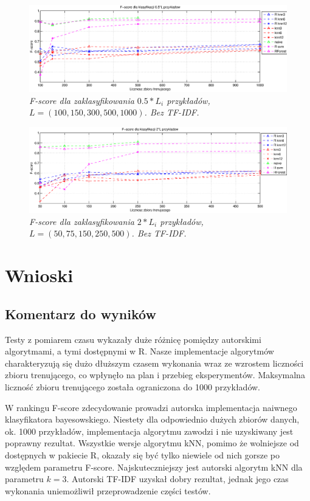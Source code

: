 \documentclass[a4paper, 10pt]{article}
\begin{document}
\begin{figure}[ht!]
\centering
\includegraphics[width=165mm]{wykresy/score1000-05.eps}
\caption{\it{F-score dla zaklasyfikowania $0.5*L_i$ przykładów, $L=(100,150,300,500,1000)$. Bez TF-IDF.}}
\label{overflow}
\end{figure}

\begin{figure}[ht!]
\centering
\includegraphics[width=165mm]{wykresy/score500-2.eps}
\caption{\it{F-score dla zaklasyfikowania $2*L_i$ przykładów, $L=(50,75,150,250,500)$. Bez TF-IDF.}}
\label{overflow}
\end{figure}

\FloatBarrier

\newpage
\section{Wnioski}

\subsection{Komentarz do wyników}

Testy z pomiarem czasu wykazały duże różnicę pomiędzy autorskimi algorytmami, a tymi dostępnymi w R. Nasze implementacje algorytmów charakteryzują się dużo dłuższym
czasem wykonania wraz ze wzrostem liczności zbioru trenującego, co wpłynęło na plan i przebieg eksperymentów. Maksymalna liczność zbioru trenującego została ograniczona do 1000 przykładów.

W rankingu F-score zdecydowanie prowadzi autorska implementacja naiwnego klasyfikatora bayesowskiego. Niestety dla odpowiednio dużych zbiorów danych, ok. 1000 przykładów, implementacja algorytmu
zawodzi i nie uzyskiwany jest poprawny rezultat. Wszystkie wersje algorytmu kNN, pomimo że wolniejsze od dostępnych w pakiecie R, okazały się być tylko niewiele od nich gorsze po względem parametru F-score. Najskuteczniejszy jest autorski
algorytm kNN dla parametru $k=3$. Autorski TF-IDF uzyskał dobry rezultat, jednak jego czas wykonania uniemożliwił przeprowadzenie części testów.
\end{document}
